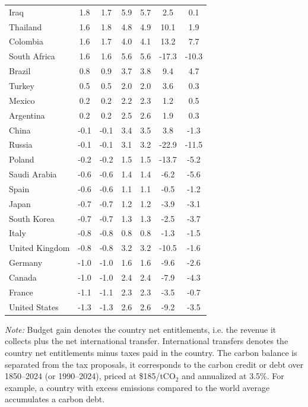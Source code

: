 \documentclass[12pt,english]{article}
\begin{document}
\begin{bibunit}
\begin{table}[!h]
{\begin{tabular}[t]{lcccccc}
Iraq & 1.8 & 1.7 & 5.9 & 5.7 & 2.5 & 0.1\\
Thailand & 1.6 & 1.8 & 4.8 & 4.9 & 10.1 & 1.9\\
Colombia & 1.6 & 1.7 & 4.0 & 4.1 & 13.2 & 7.7\\
South Africa & 1.6 & 1.6 & 5.6 & 5.6 & -17.3 & -10.3\\
Brazil & 0.8 & 0.9 & 3.7 & 3.8 & 9.4 & 4.7\\
Turkey & 0.5 & 0.5 & 2.0 & 2.0 & 3.6 & 0.3\\
Mexico & 0.2 & 0.2 & 2.2 & 2.3 & 1.2 & 0.5\\
Argentina & 0.2 & 0.2 & 2.5 & 2.6 & 1.9 & 0.3\\
China & -0.1 & -0.1 & 3.4 & 3.5 & 3.8 & -1.3\\
Russia & -0.1 & -0.1 & 3.1 & 3.2 & -22.9 & -11.5\\
Poland & -0.2 & -0.2 & 1.5 & 1.5 & -13.7 & -5.2\\
Saudi Arabia & -0.6 & -0.6 & 1.4 & 1.4 & -6.2 & -5.6\\
Spain & -0.6 & -0.6 & 1.1 & 1.1 & -0.5 & -1.2\\
Japan & -0.7 & -0.7 & 1.2 & 1.2 & -3.9 & -3.1\\
South Korea & -0.7 & -0.7 & 1.3 & 1.3 & -2.5 & -3.7\\
Italy & -0.8 & -0.8 & 0.8 & 0.8 & -1.3 & -1.5\\
United Kingdom & -0.8 & -0.8 & 3.2 & 3.2 & -10.5 & -1.6\\
Germany & -1.0 & -1.0 & 1.6 & 1.6 & -9.6 & -2.6\\
Canada & -1.0 & -1.0 & 2.4 & 2.4 & -7.9 & -4.3\\
France & -1.1 & -1.1 & 2.3 & 2.3 & -3.5 & -0.7\\
United States & -1.3 & -1.3 & 2.6 & 2.6 & -9.2 & -3.5\\
\bottomrule
\end{tabular}
} 
{\footnotesize \textit{Note:} Budget gain denotes the country net entitlements, i.e. the revenue it collects plus the net international transfer. International transfers denotes the country net entitlements minus taxes paid in the country. The carbon balance is separated from the tax proposals, it corresponds to the carbon credit or debt over 1850--2024 (or 1990--2024), priced at \$185/tCO$_\text{2}$ and annualized at 3.5\%. For example, a country with excess emissions compared to the world average accumulates a carbon debt. %
}
\end{table}



\end{bibunit}
\end{document}
